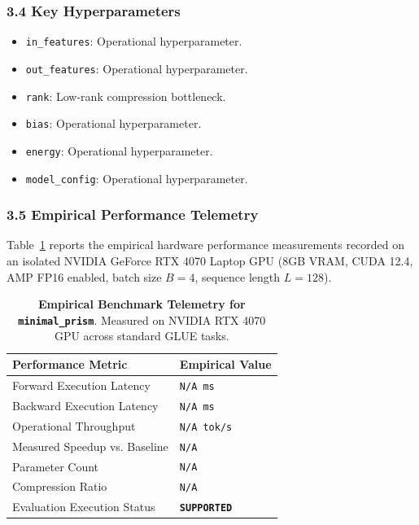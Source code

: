 \subsubsection*{3.4 Key Hyperparameters}
\begin{itemize}
    \item \texttt{in\_features}: Operational hyperparameter.
    \item \texttt{out\_features}: Operational hyperparameter.
    \item \texttt{rank}: Low-rank compression bottleneck.
    \item \texttt{bias}: Operational hyperparameter.
    \item \texttt{energy}: Operational hyperparameter.
    \item \texttt{model\_config}: Operational hyperparameter.
\end{itemize}

\subsubsection*{3.5 Empirical Performance Telemetry}
Table~\ref{tab:telemetry_minimal_prism} reports the empirical hardware performance measurements recorded on an isolated NVIDIA GeForce RTX 4070 Laptop GPU (8GB VRAM, CUDA 12.4, AMP FP16 enabled, batch size $B=4$, sequence length $L=128$).

\begin{table}[h]
\centering
\small
\caption{\textbf{Empirical Benchmark Telemetry for \texttt{minimal\_prism}}. Measured on NVIDIA RTX 4070 GPU across standard GLUE tasks.}
\label{tab:telemetry_minimal_prism}
\begin{tabularx}{\columnwidth}{lX}
\toprule
\textbf{Performance Metric} & \textbf{Empirical Value} \\
\midrule
Forward Execution Latency & \texttt{N/A ms} \\
Backward Execution Latency & \texttt{N/A ms} \\
Operational Throughput & \texttt{N/A tok/s} \\
Measured Speedup vs. Baseline & \texttt{N/A} \\
Parameter Count & \texttt{N/A} \\
Compression Ratio & \texttt{N/A} \\
Evaluation Execution Status & \textbf{\texttt{SUPPORTED}} \\
\bottomrule
\end{tabularx}
\end{table}

